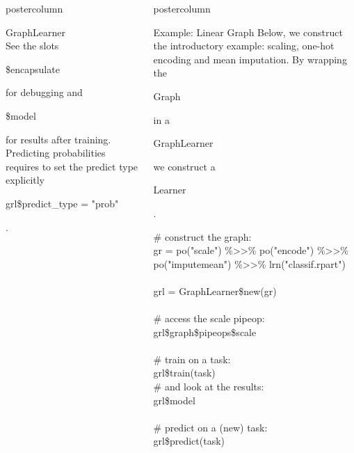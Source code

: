 \documentclass{beamer}
\newlength{\columnheight} %
\newcommand{\codeinline}[1]{\begin{codeboxinline}#1\end{codeboxinline}}
\begin{document}
\begin{frame}[fragile]{}
\begin{columns}
\begin{column}{.245\textwidth}
\begin{beamercolorbox}[center]{postercolumn}
\begin{minipage}{.98\textwidth}
{\begin{myblock}{GraphLearner}
              \ \\
              See the slots \codeinline{\$encapsulate} for debugging and \codeinline{\$model} for results after training. Predicting probabilities requires to set the predict type explicitly \codeinline{grl\$predict\_type = "prob"}.
						\end{myblock}
						\vfill}
				\end{minipage}
			\end{beamercolorbox}
		\end{column}
		\begin{column}{.245\textwidth}
			\begin{beamercolorbox}[center]{postercolumn}
				\begin{minipage}{.98\textwidth}
					\parbox[t][\columnheight]{\textwidth}{
            \begin{myblock}{Example: Linear Graph}
              \vspace{-0.5em}
              Below, we construct the introductory example: scaling, one-hot encoding and mean imputation. By wrapping the \codeinline{Graph} in a \codeinline{GraphLearner} we construct a \codeinline{Learner}.
              \begin{codeboxexample}
                {\footnotesize
                  \# construct the graph:\\
                  gr = po("scale") \%>{}>\% po("encode") \%>{}>\%\\
                  \hspace*{1ex} po("imputemean") \%>{}>\% lrn("classif.rpart")\\
                  \ \\
                  grl = GraphLearner\$new(gr)\\
                  \ \\
                  \# access the scale pipeop:
                  grl\$graph\$pipeops\$scale\\
                  \ \\
                  \# train on a task:\\
                  grl\$train(task)\\
                  \# and look at the results:\\
                  grl\$model\\
                  \ \\
                  \# predict on a (new) task:\\
                  grl\$predict(task)\\
}
\end{codeboxexample}
\end{myblock}}
\end{minipage}
\end{beamercolorbox}
\end{column}
\end{columns}
\end{frame}
\end{document}
